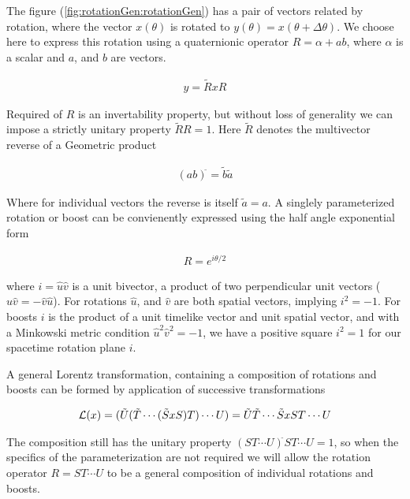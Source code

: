 The figure (\ref{fig:rotationGen:rotationGen}) has a pair of vectors related by rotation, where the vector $x(\theta)$ is rotated to $y(\theta) = x(\theta + \Delta\theta)$. We choose here to express this rotation using a quaternionic operator $R = \alpha + a b$, where $\alpha$ is a scalar and $a$, and $b$ are vectors.

\begin{align}\label{eqn:rotationGen:foo1}
y = \tilde{R} x R
\end{align}

Required of $R$ is an invertability property, but without loss of generality we can impose a strictly unitary property $\tilde{R} R = 1$.  Here $\tilde{R}$ denotes the multivector reverse of a Geometric product

\begin{align}\label{eqn:rotationGen:foo2}
(a b)^{\tilde{}} = \tilde{b} \tilde{a}
\end{align}

Where for individual vectors the reverse is itself $\tilde{a} = a$.  A singlely parameterized rotation or boost can be convienently expressed using the half angle exponential form

\begin{align}\label{eqn:rotationGen:foo3}
R = e^{i \theta/2} 
\end{align}

where $i = \hat{u}\hat{v}$ is a unit bivector, a product of two perpendicular unit vectors ($\hat{u} \hat{v} = - \hat{v} \hat{u}$).  For rotations $\hat{u}$, and $\hat{v}$ are both spatial vectors, implying $i^2 = -1$.  For boosts $i$ is the product of a unit timelike vector and unit spatial vector, and with a Minkowski metric condition $\hat{u}^2 \hat{v}^2 = -1$, we have a positive square $i^2 = 1$ for our spacetime rotation plane $i$.

A general Lorentz transformation, containing a composition of rotations and boosts can be formed by application of successive transformations 

\begin{align}\label{eqn:rotationGen:foo4}
\mathcal{L}(x) = (\tilde{U} (\tilde{T} \cdots (\tilde{S} x S) T )\cdots U) = \tilde{U} \tilde{T} \cdots \tilde{S} x S T \cdots U
\end{align}

The composition still has the unitary property $(S T \cdots U)^{\tilde{}} S T \cdots U = 1$, so when the specifics of the parameterization are not required we will allow the rotation operator $R = S T \cdots U$ to be a general composition of individual rotations and boosts.

